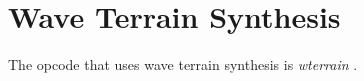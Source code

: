 \begin{comment}
\documentclass[10pt]{article}
\usepackage{fullpage, graphicx, url}
\setlength{\parskip}{1ex}
\setlength{\parindent}{0ex}
\title{Wave Terrain Synthesis}



\begin{tabular}{ccc}
The Alternative Csound Reference Manual & & \\
Previous &Signal Generators &Next

\end{tabular}

\end{comment}
\section{Wave Terrain Synthesis}


  The opcode that uses wave terrain synthesis is \emph{wterrain}
. 


\begin{comment}
\begin{tabular}{lcr}
Previous &Home &Next \\
Table Access &Up &Waveguide Physical Modeling

\end{tabular}



\end{comment}
